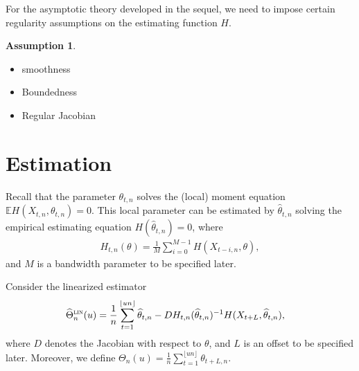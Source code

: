 \documentclass[12pt,a4paper]{article}
\theoremstyle{definition}
\newtheorem{assumption}{Assumption}[section]
\theoremstyle{definition}
\theoremstyle{theorem}
\newcommand{\E}{\mathbb{E}}
\begin{document}
For the asymptotic theory developed in the sequel, we need to impose certain regularity assumptions on the estimating function $H$.

\begin{assumption}
    \color{purple}
    \begin{itemize}
        \item smoothness
        \item Boundedness
        \item Regular Jacobian
    \end{itemize}
\end{assumption}



\section{Estimation}

Recall that the parameter $\theta_{t,n}$ solves the (local) moment equation $\E H(X_{t,n}, \theta_{t,n})=0$.
This local parameter can be estimated by $\widehat{\theta}_{t,n}$ solving the empirical estimating equation $H(\widehat{\theta}_{t,n})=0$, where
\begin{align*}
    H_{t,n}(\theta) = \frac{1}{M}\sum_{i=0}^{M-1} H(X_{t-i,n},\theta),
\end{align*}
and $M$ is a bandwidth parameter to be specified later.





Consider the linearized estimator
\begin{align*}
    \widehat{\Theta}_n^{\textsc{lin}}(u)
    &=\frac{1}{n} \sum_{t=1}^{\lfloor un \rfloor} \widehat{\theta}_{t,n} - DH_{t,n}(\widehat{\theta}_{t,n})^{-1} H(X_{t+L}, \widehat{\theta}_{t,n}) ,
\end{align*}
where $D$ denotes the Jacobian with respect to $\theta$, and $L$ is an offset to be specified later. 
Moreover, we define $\Theta_{n}(u) = \frac{1}{n} \sum_{t=1}^{\lfloor un\rfloor} \theta_{t+L,n}$.
\end{document}
